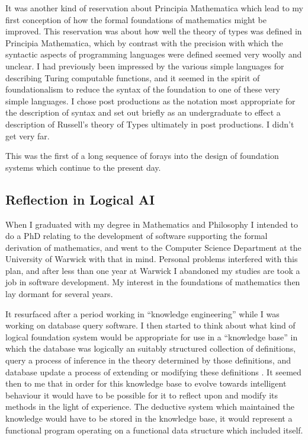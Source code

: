 It was another kind of reservation about Principia Mathematica which lead to my first conception of how the formal foundations of mathematics might be improved.
This reservation was about how well the theory of types was defined in Principia Mathematica, which by contrast with the precision with which the syntactic aspects of programming languages were defined seemed very woolly and unclear.
I had previously been impressed by the various simple languages for describing Turing computable functions, and it seemed in the spirit of foundationalism to reduce the syntax of the foundation to one of these very simple languages.
I chose post productions as the notation most appropriate for the description of syntax and set out briefly as an undergraduate to effect a description of Russell's theory of Types ultimately in post productions.
I didn't get very far.

This was the first of a long sequence of forays into the design of foundation systems which continue to the present day.

\subsection{Reflection in Logical AI}

When I graduated with my degree in Mathematics and Philosophy I intended to do a PhD relating to the development of software supporting the formal derivation of mathematics, and went to the Computer Science Department at the University of Warwick with that in mind.
Personal problems interfered with this plan, and after less than one year at Warwick I abandoned my studies are took a job in software development.
My interest in the foundations of mathematics then lay dormant for several years.

It resurfaced after a period working in ``knowledge engineering'' \cite{jones82} while I was working on database query software.
I then started to think about what kind of logical foundation system would be appropriate for use in a ``knowledge base'' in which the database was logically an suitably structured collection of definitions, query a process of inference in the theory determined by those definitions, and database update a process of extending or modifying these definitions \cite{jones85}.
It seemed then to me that in order for this knowledge base to evolve towards intelligent behaviour it would have to be possible for it to reflect upon and modify its methods in the light of experience.
The deductive system which maintained the knowledge would have to be stored in the knowledge base, it would represent a functional program operating on a functional data structure which included itself.

